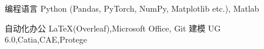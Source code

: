 

\begin{cvskills}

  \cvskill
    {编程语言} %
    {Python (Pandas, PyTorch, NumPy, Matplotlib etc.), Matlab} %

  \cvskill
    {自动化办公} %
    { \LaTeX (Overleaf),Microsoft Office, Git} %
  \cvskill
    {建模} %
    {UG 6.0,Catia,CAE,Protege} %

\end{cvskills}
